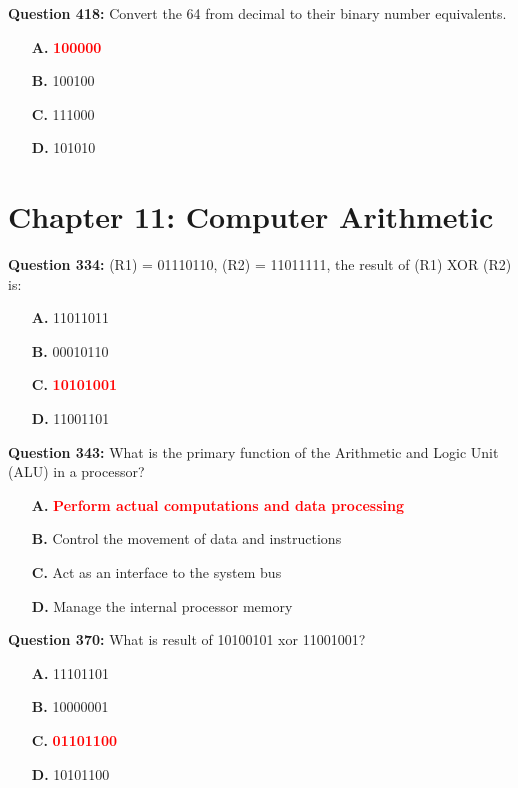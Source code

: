 \documentclass[12pt,a4paper]{article}
\begin{document}
\textbf{Question 418:} Convert the 64 from decimal to their binary number equivalents.

\begin{itemize}
    \item[\textbf{A.}] \textcolor{red}{\textbf{100000}}
    \item[\textbf{B.}] 100100
    \item[\textbf{C.}] 111000
    \item[\textbf{D.}] 101010
\end{itemize}

\vspace{0.5cm}

\section{Chapter 11: Computer Arithmetic}

\textbf{Question 334:} (R1) = 01110110, (R2) = 11011111, the result of (R1) XOR (R2) is:

\begin{itemize}
    \item[\textbf{A.}] 11011011
    \item[\textbf{B.}] 00010110
    \item[\textbf{C.}] \textcolor{red}{\textbf{10101001}}
    \item[\textbf{D.}] 11001101
\end{itemize}

\vspace{0.5cm}

\textbf{Question 343:} What is the primary function of the Arithmetic and Logic Unit (ALU) in a processor?

\begin{itemize}
    \item[\textbf{A.}] \textcolor{red}{\textbf{Perform actual computations and data processing}}
    \item[\textbf{B.}] Control the movement of data and instructions
    \item[\textbf{C.}] Act as an interface to the system bus
    \item[\textbf{D.}] Manage the internal processor memory
\end{itemize}

\vspace{0.5cm}

\textbf{Question 370:} What is result of 10100101 xor 11001001?

\begin{itemize}
    \item[\textbf{A.}] 11101101
    \item[\textbf{B.}] 10000001
    \item[\textbf{C.}] \textcolor{red}{\textbf{01101100}}
    \item[\textbf{D.}] 10101100
\end{itemize}
\end{document}
